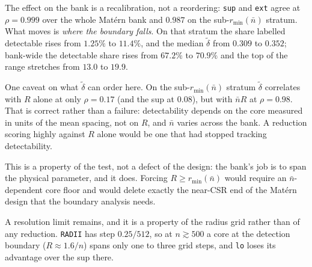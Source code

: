 \documentclass[11pt]{article}
\newcommand{\dt}{\tilde\delta}
\newcommand{\nb}{\bar n}
\newcommand{\rmin}{r_{\min}(\nb)}
\newcommand{\code}[1]{\texttt{#1}}
\begin{document}
The effect on the bank is a recalibration, not a reordering: \code{sup} and \code{ext} agree at $\rho=0.999$ over the whole Mat\'ern bank and $0.987$ on the sub-$\rmin$ stratum. What moves is \emph{where the boundary falls}. On that stratum the share labelled detectable rises from $1.25\%$ to $11.4\%$, and the median $\dt$ from $0.309$ to $0.352$; bank-wide the detectable share rises from $67.2\%$ to $70.9\%$ and the top of the range stretches from $13.0$ to $19.9$.

One caveat on what $\dt$ can order here. On the sub-$\rmin$ stratum $\dt$ correlates with $R$ alone at only $\rho=0.17$ (and the sup at $0.08$), but with $\nb R$ at $\rho=0.98$. That is correct rather than a failure: detectability depends on the core measured in units of the mean spacing, not on $R$, and $\nb$ varies across the bank. A reduction scoring highly against $R$ alone would be one that had stopped tracking detectability.

This is a property of the test, not a defect of the design: the bank's job is to span the physical parameter, and it does. Forcing $R\ge\rmin$ would require an $\nb$-dependent core floor and would delete exactly the near-CSR end of the Mat\'ern design that the boundary analysis needs.

A resolution limit remains, and it is a property of the radius grid rather than of any reduction. \code{RADII} has step $0.25/512$, so at $n\gtrsim500$ a core at the detection boundary ($R\approx1.6/n$) spans only one to three grid steps, and \code{lo} loses its advantage over the sup there.
\end{document}
